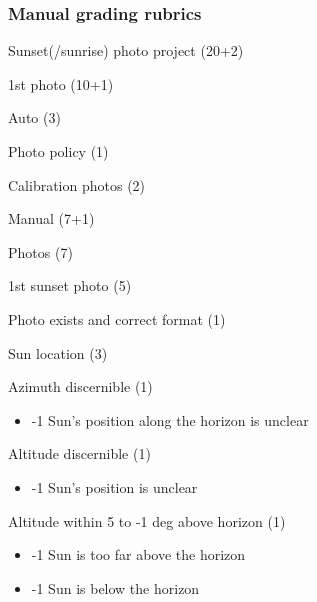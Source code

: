 \documentclass[12pt]{article}
\begin{document}
\subsubsection{Manual grading rubrics}

Sunset(/sunrise) photo project (20+2)
\begin{longenum}
\item 1st photo (10+1)
    \begin{longenum}
    \item Auto (3)
        \begin{longenum}
        \item Photo policy (1)
        \item Calibration photos (2)
        \end{longenum}
    \item Manual (7+1)
        \begin{longenum}
        \item Photos (7)
        	\begin{longenum}
            \item 1st sunset photo (5)
                \begin{longenum}
                \item Photo exists and correct format (1)
                \item Sun location (3)
                    \begin{longenum}
                    \item Azimuth discernible (1)
                        \begin{itemize}
                        \item -1 Sun's position along the horizon is unclear
                        \end{itemize}
                    \item Altitude discernible (1)
                        \begin{itemize}
                        \item -1 Sun's position is unclear
                        \end{itemize}
                    \item Altitude within 5 to -1 deg above horizon (1)
                        \begin{itemize}
                        \item -1 Sun is too far above the horizon
                        \item -1 Sun is below the horizon
                        \end{itemize}

\end{longenum}
\end{longenum}
\end{longenum}
\end{longenum}
\end{longenum}
\end{longenum}
\end{document}
